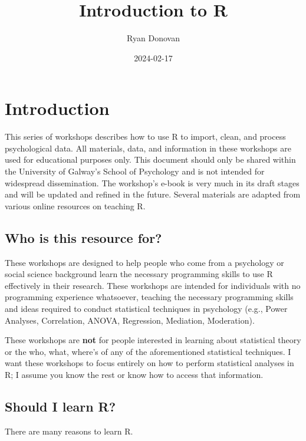 \documentclass[
]{book}
\title{Introduction to R}
\author{Ryan Donovan}
\date{2024-02-17}
\begin{document}
\maketitle

{
\setcounter{tocdepth}{1}
\tableofcontents
}
\hypertarget{introduction}{%
\chapter{\texorpdfstring{\textbf{Introduction}}{Introduction}}\label{introduction}}

This series of workshops describes how to use R to import, clean, and process psychological data. All materials, data, and information in these workshops are used for educational purposes only. This document should only be shared within the University of Galway's School of Psychology and is not intended for widespread dissemination. The workshop's e-book is very much in its draft stages and will be updated and refined in the future. Several materials are adapted from various online resources on teaching R.

\hypertarget{who-is-this-resource-for}{%
\section{Who is this resource for?}\label{who-is-this-resource-for}}

These workshops are designed to help people who come from a psychology or social science background learn the necessary programming skills to use R effectively in their research. These workshops are intended for individuals with no programming experience whatsoever, teaching the necessary programming skills and ideas required to conduct statistical techniques in psychology (e.g., Power Analyses, Correlation, ANOVA, Regression, Mediation, Moderation).

These workshops are \textbf{not} for people interested in learning about statistical theory or the who, what, where's of any of the aforementioned statistical techniques. I want these workshops to focus entirely on how to perform statistical analyses in R; I assume you know the rest or know how to access that information.

\hypertarget{should-i-learn-r}{%
\section{Should I learn R?}\label{should-i-learn-r}}

There are many reasons to learn R.
\end{document}
